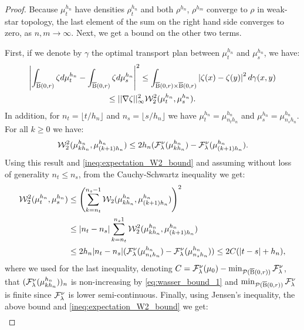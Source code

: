 \begin{proof}
Because $\mu_t^{h_n}$ have densities $\rho_t^{h_n}$ and both $\rho^{h_n}$, $\rho^{h_m}$ converge to $\rho$ in weak-star topology, the last element of the sum on the right hand side converges to zero, as $n,m \rightarrow \infty$. Next, we get a bound on the other two terms.


First, if we denote by $\gamma$ the optimal transport plan between $\mu_t^{h_n}$ and $\mu_s^{h_n}$, we have:
\begin{multline} \label{ineq:expectation_W2_bound}
\left| \int_{\operatorname{\overline{B}}(0,r)} \zeta d\mu_t^{h_n} - \int_{\operatorname{\overline{B}}(0,r)} \zeta d\mu_s^{h_n} \right|^2 \leq \int_{\operatorname{\overline{B}}(0,r) \times \operatorname{\overline{B}}(0,r)} \left| \zeta(x) - \zeta(y) \right|^2 d\gamma(x,y)\\ \leq ||\nabla \zeta||_{\infty}^2 {\cal W}_2^2(\mu_t^{h_n}, \mu_s^{h_n}).
\end{multline}
In addition, for $n_t = \lfloor t/h_n \rfloor$ and $n_s = \lfloor s/h_n \rfloor$ we have $\mu_t^{h_n} = \mu_{n_t h_n}^{h_n}$ and $\mu_s^{h_n} = \mu_{n_s h_n}^{h_n}$. For all $k \geq 0$ we have:
\begin{equation}
  \label{eq:wasser_bound_1}
{\cal W}_2^2(\mu_{kh_n}^{h_n}, \mu_{(k+1)h_n}^{h_n}) \leq 2h_n(\mathcal{F}^{\nu}_{\lambda}(\mu_{kh_n}^{h_n}) - \mathcal{F}^{\nu}_{\lambda}(\mu_{(k+1)h_n}^{h_n})  .  
\end{equation}
Using this result and \eqref{ineq:expectation_W2_bound} and assuming without loss of generality $n_t \leq n_s$, from the Cauchy-Schwartz inequality we get:
\begin{align}
\nonumber
  {\cal W}_2^2(\mu_{t}^{h_n}, \mu_s^{h_n}) & \leq \left( \sum_{k= n_t}^{n_s-1} {\cal W}_2(\mu_{kh_n}^{h_n}, \mu_{(k+1)h_n}^{h_n}) \right)^2 \\
  \nonumber
                                   & \leq |n_t - n_s|\sum_{k=n_t}^{n_s 1} {\cal W}_2^2(\mu_{kh_n}^{h_n}, \mu_{(k+1)h_n}^{h_n}) \\
    \label{eq:wasser_bound_2}
& \leq 2h_n|n_t - n_s|(\mathcal{F}^{\nu}_{\lambda}(\mu_{n_t h_n}^{h_n}) - \mathcal{F}^{\nu}_{\lambda}(\mu_{n_s h_n}^{h_n}))  \leq 2C(|t-s| + h_n),
\end{align}
where we used for the last inequality, denoting $C = \mathcal{F}^{\nu}_{\lambda}(\mu_0) - \min_{{\cal P}(\operatorname{\overline{B}}(0,r))} \mathcal{F}^{\nu}_{\lambda}$, that $(\mathcal{F}^{\nu}_{\lambda}(\mu_{kh_n}^{h_n}))_n$ is non-increasing by \eqref{eq:wasser_bound_1} and $\min_{{\cal P}(\operatorname{\overline{B}}(0,r))} \mathcal{F}^{\nu}_{\lambda}$ is finite since $ \mathcal{F}^{\nu}_{\lambda}$ is lower semi-continuous.
Finally, using Jensen's inequality, the above bound and \ref{ineq:expectation_W2_bound} we get:
\[
\begin{aligned}

\end{aligned}\]
\end{proof}
